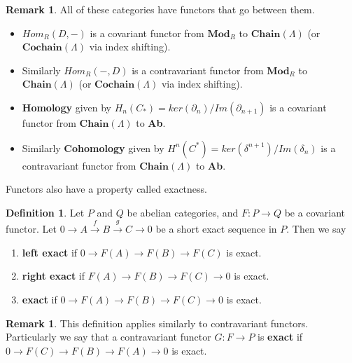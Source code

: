 \documentclass[12pt]{book}
\theoremstyle{definition}
\newtheorem{definition}[theorem]{Definition}
\newtheorem{remark}[theorem]{Remark}
\begin{document}
\begin{remark}
    All of these categories have functors that go between them. 
    \begin{itemize}
        \item $Hom_R(D, -)$ is a covariant functor from $\textbf{Mod}_R$ to $\textbf{Chain}(\Lambda)$ (or $\textbf{Cochain}(\Lambda)$ via index shifting).
        \item Similarly $Hom_R(-, D)$ is a contravariant functor from $\textbf{Mod}_R$ to $\textbf{Chain}(\Lambda)$ (or $\textbf{Cochain}(\Lambda)$ via index shifting).
        \item \textbf{Homology} given by $H_n(C_*) = ker(\partial_n)/Im(\partial_{n+1})$ is a covariant functor from $\textbf{Chain}(\Lambda)$ to \textbf{Ab}.
        \item Similarly \textbf{Cohomology} given by $H^n(C^*) = ker(\delta^{n+1})/Im(\delta_{n})$ is a contravariant functor from $\textbf{Chain}(\Lambda)$ to \textbf{Ab}.
    \end{itemize}
\end{remark}

Functors also have a property called exactness. 

\begin{definition}
    Let $P$ and $Q$ be abelian categories, and $F : P \to Q$ be a covariant functor. Let $0 \rightarrow A \xrightarrow{f} B \xrightarrow{g} C \rightarrow 0$ be a short exact sequence in $P$. Then we say
    \begin{enumerate}
        \item \textbf{left exact} if $0 \rightarrow F(A) \rightarrow F(B) \rightarrow F(C)$ is exact. 
        \item \textbf{right exact} if $F(A) \rightarrow F(B) \rightarrow F(C) \rightarrow 0$ is exact.
        \item \textbf{exact} if $0 \rightarrow F(A) \rightarrow F(B) \rightarrow F(C) \rightarrow 0$ is exact. 
    \end{enumerate}
\end{definition}

\begin{remark}
    This definition applies similarly to contravariant functors. Particularly we say that a contravariant functor $G: F \to P$ is \textbf{exact} if $0 \rightarrow F(C) \rightarrow F(B) \rightarrow F(A) \rightarrow 0$ is exact. 
\end{remark}
\end{document}
